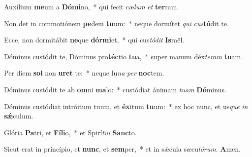 \vs Auxílium \textbf{me}um a \textbf{Dó}\textbf{mi}no,~* qui fecit cæ\textit{lum} \textit{et} \textbf{ter}ram.

\vs Non det in commotiónem \textbf{pe}dem \textbf{tu}\-um:~* neque dormítet \textit{qui} \textit{cus}\textbf{tó}dit te.

\vs Ecce, non dormitábit \textbf{ne}que \textbf{dór}\-\textbf{mi}\-et,~* qui cus\textit{tó}\textit{dit} \textbf{Is}raël.

\vs Dóminus custódit te, Dóminus pro\-\textbf{téc}\-tio \textbf{tu}a,~* super manum déx\textit{te}\textit{ram} \textbf{tu}am.

\vs Per diem \textbf{sol} non \textbf{u}\textbf{ret} te:~* neque lu\textit{na} \textit{per} \textbf{noc}tem.

\vs Dóminus custódit te ab \textbf{om}ni \textbf{ma}lo:~* custódiat ánimam \textit{tu}\textit{am} \textbf{Dó}\-mi\-nus.

\vs Dóminus custódiat intróitum tuum, et \textbf{éx}itum \textbf{tu}um:~* ex hoc nunc, et us\textit{que} \textit{in} \textbf{sǽ}culum.

\vs Glória \textbf{Pa}tri, et \textbf{Fí}\textbf{li}o,~* et Spirí\textit{tu}\textit{i} \textbf{Sanc}to.

\vs Sicut erat in princípio, et \textbf{nunc}, et \textbf{sem}per,~* et in sǽcula sæcu\textit{ló}\textit{rum}. \textbf{A}men.

